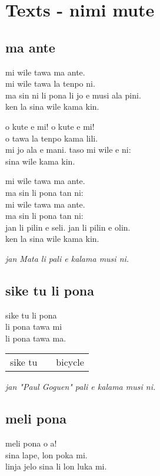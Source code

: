 
\section{Texts - nimi mute}

\subsection{ma ante}
mi wile tawa ma ante. \\
mi wile tawa la tenpo ni.   \\
ma sin ni li pona li jo e musi ala pini. \\
ken la sina wile kama kin.

o kute e mi! o kute e mi!  \\
o tawa la tenpo kama lili.    \\
mi jo ala e mani. taso mi wile e ni: \\
sina wile kama kin.

mi wile tawa ma ante. \\
ma sin li pona tan ni: \\
mi wile tawa ma ante. \\
ma sin li pona tan ni: \\
jan li pilin e seli. jan li pilin e olin. \\
ken la sina wile kama kin.

\textit{jan Mata li pali e kalama musi ni. \cite{www:Mata:01,www:Mata:02}}

\subsection{sike tu li pona}
sike tu li pona  \\
li pona tawa mi  \\
li pona tawa ma.

\begin{supertabular}{p{5,5cm}|ll}
    sike tu &  & bicycle \\
\end{supertabular}

\textit{jan "Paul Goguen"  pali e kalama musi ni. \cite{www:PaulGoguen:01}}

\subsection{meli pona}
meli pona o a! \\
sina lape, lon poka mi. \\
linja jelo sina li lon luka mi.

